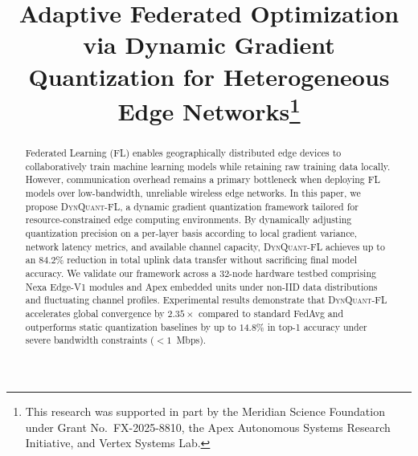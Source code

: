 \documentclass[conference]{IEEEtran}
\begin{document}
\title{Adaptive Federated Optimization via Dynamic Gradient Quantization for Heterogeneous Edge Networks\thanks{This research was supported in part by the Meridian Science Foundation under Grant No.~FX-2025-8810, the Apex Autonomous Systems Research Initiative, and Vertex Systems Lab.}}

\author{
}

\maketitle

\begin{abstract}
Federated Learning (FL) enables geographically distributed edge devices to collaboratively train machine learning models while retaining raw training data locally. However, communication overhead remains a primary bottleneck when deploying FL models over low-bandwidth, unreliable wireless edge networks. In this paper, we propose \textsc{DynQuant-FL}, a dynamic gradient quantization framework tailored for resource-constrained edge computing environments. By dynamically adjusting quantization precision on a per-layer basis according to local gradient variance, network latency metrics, and available channel capacity, \textsc{DynQuant-FL} achieves up to an $84.2\%$ reduction in total uplink data transfer without sacrificing final model accuracy. We validate our framework across a 32-node hardware testbed comprising Nexa Edge-V1 modules and Apex embedded units under non-IID data distributions and fluctuating channel profiles. Experimental results demonstrate that \textsc{DynQuant-FL} accelerates global convergence by $2.35\times$ compared to standard FedAvg and outperforms static quantization baselines by up to $14.8\%$ in top-1 accuracy under severe bandwidth constraints ($<1$~Mbps).
\end{abstract}
\end{document}
